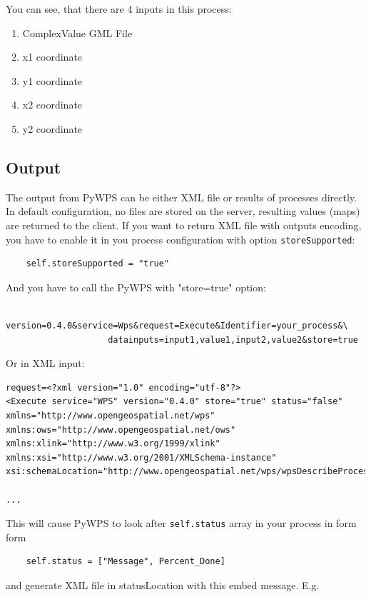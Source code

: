 \documentclass[a4paper,11pt]{article}
\begin{document}
    You can see, that there are 4 inputs in this process: 
     
    \begin{enumerate}
            \item ComplexValue GML File 
            \item x1 coordinate 
            \item y1 coordinate 
            \item x2 coordinate 
            \item y2 coordinate 
    \end{enumerate}
    \subsection{Output}
     
    The output from PyWPS can be either XML file or results of processes directly. In default configuration, no files are stored on the server, resulting values (maps) are 
    returned to the client. If you want to return XML file with outputs
    encoding, you have to enable it in you process configuration with
    option \texttt{storeSupported}:
     
    \begin{verbatim}
    self.storeSupported = "true"
    \end{verbatim}
     
    And you have to call the PyWPS with "store=true" option:
     
    \begin{verbatim}
    version=0.4.0&service=Wps&request=Execute&Identifier=your_process&\
                    datainputs=input1,value1,input2,value2&store=true
    \end{verbatim}
     
    Or in XML input:
     
    \begin{verbatim}
request=<?xml version="1.0" encoding="utf-8"?>
<Execute service="WPS" version="0.4.0" store="true" status="false"
xmlns="http://www.opengeospatial.net/wps"
xmlns:ows="http://www.opengeospatial.net/ows"
xmlns:xlink="http://www.w3.org/1999/xlink"
xmlns:xsi="http://www.w3.org/2001/XMLSchema-instance"
xsi:schemaLocation="http://www.opengeospatial.net/wps/wpsDescribeProcess.xsd">

...
\end{verbatim}

This will cause PyWPS to look after \texttt{self.status} array in your process in form form 
\begin{verbatim}
    self.status = ["Message", Percent_Done]
\end{verbatim}
and generate XML file in statusLocation with this embed message. E.g.
\end{document}
